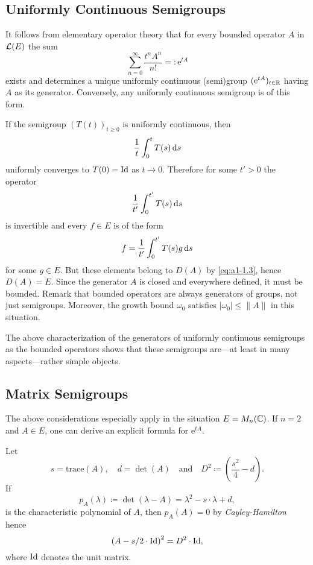 \subsection{Uniformly Continuous Semigroups}\label{subsec:a1-2.1}%
It follows from elementary operator theory that for every bounded operator $A$ in  $\mathcal{L}(E)$ the sum
\[
    \sum_{n=0}^{\infty} \frac{t^{n}A^{n}}{n!} = \colon  \mathrm{e}^{tA}
\]
exists and determines a unique uniformly continuous (semi)group $( \mathrm{e}^{tA})_{t \in \mathbb{R}}$ having $A$ as its generator.
Conversely, any uniformly continuous semigroup is of this form.

If the semigroup $(T(t))_{t \geq 0}$ is uniformly continuous, then 
%
\[
	\frac{1}{t}\int_{0}^{t} T(s) \mathop{}\!\mathrm{d}{s}
\]
%
uniformly converges to $T(0) = \operatorname{Id}$ as $t \to 0$.
Therefore for some $t' > 0$ the operator 
%
\[
	\frac{1}{t'}\int_{0}^{t'} T(s) \mathop{}\!\mathrm{d}{s}
\]
%
is invertible and every $f \in E$ is of the form 
%
\[
	f = \frac{1}{t'}\int_{0}^{t'} T(s)g \mathop{}\!\mathrm{d}{s}
\]
%
for some $g \in E$.
But these elements belong to $D(A)$ by \eqref{eq:a1-1.3}, hence $D(A) = E$.
Since the generator $A$ is closed and everywhere defined, it must be bounded.
Remark that bounded operators are always generators of groups, not just semigroups.
Moreover, the growth bound $\omega_0$ satisfies $|\omega_0| \leq \|A\|$ in this situation.

The above characterization of the generators of uniformly continuous semigroups as the bounded operators shows that these semigroups are---at least in many aspects---rather simple objects.
\subsection{Matrix Semigroups}\label{subsec:a1-2.2}%
The above considerations especially apply in the situation $E = M_{n}(\mathbb{C})$.
If $n = 2$ and $A \in E$, one can derive an explicit formula for $ \mathrm{e}^{tA}$. 

Let %
\[
	s = \text{trace}(A), 
	\quad 
	d = \det(A) 
	\quad \text{and} \quad
	D^{2} \coloneqq \left( \frac{s^{2}}{4} - d \right).
\]
%
If   
\[
p_A(\lambda) \coloneqq \det(\lambda - A) = \lambda^2-s\cdot \lambda + d , 
\]
is the characteristic polynomial  of $ A $, then $ p_{A}(A) = 0 $ by \emph{Cayley-Hamilton} hence
%
\[
	\left( A - s/2 \cdot \operatorname{Id} \right)^{2} = D^{2} \cdot \operatorname{Id} , 
\]
%
where $ \operatorname{Id} $ denotes the unit matrix.

